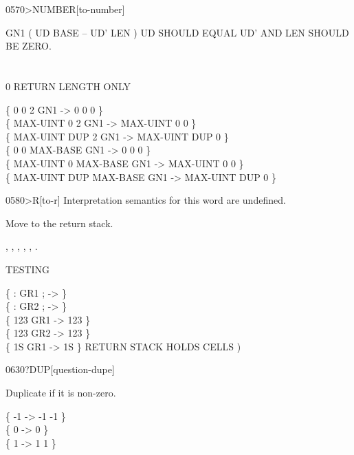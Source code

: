 \begin{worddef}[toNUMBER]{0570}{>NUMBER}[to-number]
\begin{defer}
		\word{:} GN1  ( UD BASE -- UD' LEN ) UD SHOULD EQUAL UD' AND LEN SHOULD BE ZERO. \\
		\tab	{}    \word{!} \\
		\tab	{}   \\
		 0     \tab {} RETURN LENGTH ONLY \\
		\tab	{}  \word{!} \word{;}

		\{        0   0        2 GN1 ->        0   0 0 \} \\
		\{ MAX-UINT   0        2 GN1 -> MAX-UINT   0 0 \} \\
		\{ MAX-UINT DUP        2 GN1 -> MAX-UINT DUP 0 \} \\
		\{        0   0 MAX-BASE GN1 ->        0   0 0 \} \\
		\{ MAX-UINT   0 MAX-BASE GN1 -> MAX-UINT   0 0 \} \\
		\{ MAX-UINT DUP MAX-BASE GN1 -> MAX-UINT DUP 0 \}
	\end{defer}
\end{worddef}


\begin{worddef}[toR]{0580}{>R}[to-r]
\interpret
	Interpretation semantics for this word are undefined.

\execute

	Move  to the return stack.

\see {},
	,
	,
	,
	,
	.

	\begin{defer}
	\testing
		TESTING   

		\{ : GR1   ; -> \} \\
		\{ : GR2     ; -> \} \\
		\{ 123 GR1 -> 123 \} \\
		\{ 123 GR2 -> 123 \} \\
		\{ 1S GR1 -> 1S \} \tab[2]  RETURN STACK HOLDS CELLS )
	\end{defer}
\end{worddef}


\begin{worddef}[qDUP]{0630}{?DUP}[question-dupe]
\item {}

	Duplicate  if it is non-zero.

	\begin{defer}
	\testing
		\{ -1  -> -1 -1 \} \\
		\{  0  ->  0    \} \\
		\{  1  ->  1  1 \}
	\end{defer}
\end{worddef}


